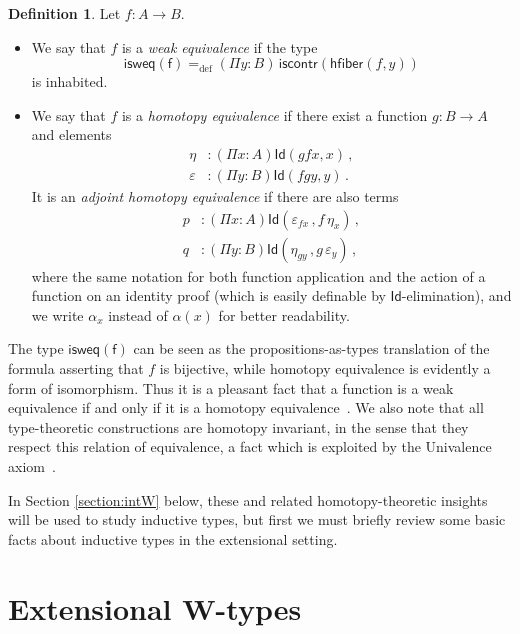 \documentclass{article}
\newcommand{\defeq}{=_{\mathrm{def}}}
\newcommand{\Id}{\mathsf{Id}}
\newcommand{\iscontr}{\mathsf{iscontr}}
\newcommand{\hfiber}{\mathsf{hfiber}}
\theoremstyle{remark}
\theoremstyle{definition}
\newtheorem{definition}[theorem]{Definition}
\begin{document}
\begin{definition} \label{thm:weq} Let $f : A \rightarrow B$.
\begin{itemize}
%
\item We say that $f$ is a \emph{weak equivalence} if  the type
\[
\mathsf{isweq(f)} \defeq (\Pi y : B) \,  \iscontr(\hfiber(f,y)) 
\]
is inhabited. 
%
\item We say that $f$ is a \emph{homotopy equivalence} if there exist a function 
$g : B\rightarrow A$ and elements
\begin{align*}
\eta &: (\Pi x : A) \Id( g  f  x , x) \,  ,\\
\varepsilon &: (\Pi y:B) \Id( f   g  y, y) \, .
\end{align*}
It is an \emph{adjoint homotopy equivalence} if there are also
terms
\begin{align*}
p &: (\Pi x : A) \Id ( \varepsilon_{f x} \, , f \, \eta_x )  \, , \\
q &: (\Pi y : B) \Id ( \eta_{g y} \, , g \, \varepsilon_y) \, ,
\end{align*}
where the same notation for both function application and
the action of a function on an identity proof (which is easily definable by $\Id$-elimination),
and we write $\alpha_x$ instead of $\alpha(x)$ for better readability.
%
\end{itemize}
\end{definition}

The type $\mathsf{isweq(f)}$ can be seen as the propositions-as-types translation of the formula asserting that $f$ is bijective, while homotopy equivalence is evidently a form of isomorphism. Thus it is a pleasant fact that a function is a weak equivalence if and only if it is a homotopy equivalence~\cite{VoevodskyV:unifc}. 
We also note that all type-theoretic constructions are homotopy invariant, in the sense that they respect this relation of equivalence, a fact which is exploited by the Univalence axiom~\cite{VoevodskyV:notts}.


\medskip

In Section \ref{section:intW} below, these and related homotopy-theoretic insights will be used to study inductive types, but first we must briefly review some basic facts about  inductive types in the extensional setting.


\section{Extensional W-types}\label{section:extW}
\end{document}
